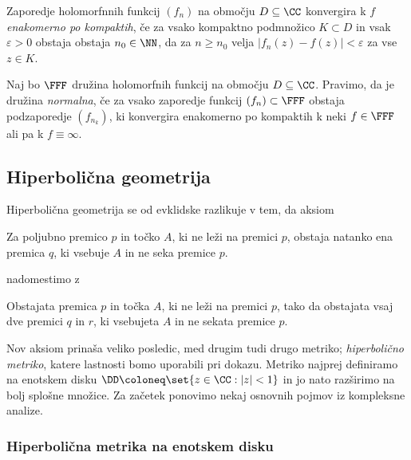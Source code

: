 \begin{definicija}
    Zaporedje holomorfnnih funkcij \((f_n)\) na območju \(D \subseteq \CC\) konvergira k \(f\) \emph{enakomerno po kompaktih}, če za vsako kompaktno podmnožico \(K \subset D\) in vsak \(\varepsilon > 0\) obstaja obstaja \(n_0 \in \NN\), da za \(n \geq n_0\) velja \(|f_n (z) - f(z)| < \varepsilon\) za vse \(z \in K\).
\end{definicija}

\begin{definicija}
    Naj bo \(\FFF\) družina holomorfnih funkcij na območju \(D \subseteq \CC\). Pravimo, da je družina \emph{normalna}, če za vsako zaporedje funkcij \((f_n) \subset \FFF\) obstaja podzaporedje \((f_{n_k})\), ki konvergira enakomerno po kompaktih k neki \(f \in \FFF\) ali pa k \(f \equiv \infty\).
\end{definicija}

\subsection{Hiperbolična geometrija}

Hiperbolična geometrija se od evklidske razlikuje v tem, da aksiom

\begin{aksiom}
    Za poljubno premico \(p\) in točko \(A\), ki ne leži na premici \(p\), obstaja natanko ena premica \(q\), ki vsebuje \(A\) in ne seka premice \(p\).
\end{aksiom}

\noindent nadomestimo z

\begin{aksiom}
    Obstajata premica \(p\) in točka \(A\), ki ne leži na premici \(p\), tako da obstajata vsaj dve premici \(q\) in \(r\), ki vsebujeta \(A\) in ne sekata premice \(p\).
\end{aksiom}

\noindent Nov aksiom prinaša veliko posledic, med drugim tudi drugo metriko; \emph{hiperbolično metriko}, katere lastnosti bomo uporabili pri dokazu. Metriko najprej definiramo na enotskem disku \(\DD \coloneq \set{z \in \CC : |z| < 1}\) in jo nato razširimo na bolj splošne množice. Za začetek ponovimo nekaj osnovnih pojmov iz kompleksne analize.

\subsubsection{Hiperbolična metrika na enotskem disku}

